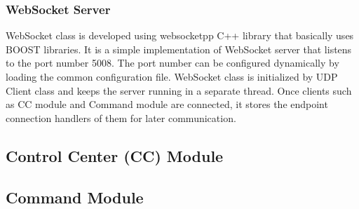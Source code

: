 \subsubsection{WebSocket Server}
WebSocket class is developed using websocketpp C++ library that basically uses BOOST libraries. It is a simple implementation of WebSocket server that listens to the port number 5008. The port number can be configured dynamically by loading the common configuration file. WebSocket class is initialized by UDP Client class and keeps the server running in a separate thread. Once clients such as CC module and Command module are connected, it stores the endpoint connection handlers of them for later communication. 


\subsection{Control Center (CC) Module}

\subsection{Command Module} 
